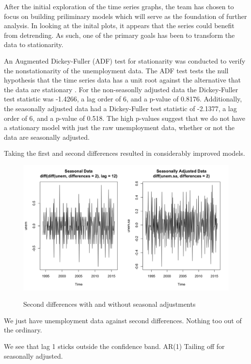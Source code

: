 {			After the initial exploration of the time series graphs, the team has chosen to focus on building priliminary models which will serve as the foundation of further analysis. In looking at the inital plots, it appears that the series could benefit from detrending. As such, one of the primary goals has been to transform the data to stationarity. \newline
			
			An Augmented Dickey-Fuller (ADF) test for stationarity was conducted to verify the nonstationarity of the unemployment data.  The ADF test tests the null hypothesis that the time series data has a unit root against the alternative that the data are stationary \citep{shumway2010time}. For the non-seasonlly adjusted data the Dickey-Fuller test statistic was -1.4266, a lag order of 6, and a p-value of 0.8176. Additionally, the seasonally adjusted data had a Dickey-Fuller test statistic of -2.1377, a lag order of 6, and a p-value of 0.518. The high p-values suggest that we do not have a stationary model with just the raw unemployment data, whether or not the data are seasonally adjusted.\newline
			
			Taking the first and second differences resulted in considerably improved models.

		
 \begin{figure}[H]
      	\centering
      	\caption{Second differences with and without seasonal adjustments}
      	\includegraphics[width=.7\linewidth]{images/stationarity}
      	\label{fig:secdiff}
      \end{figure}
		
		
		
		
		We just have unemployment data against second differences.
		Nothing too out of the ordinary.
		
		We see that lag 1 sticks outside the confidence band.  AR(1)
		Tailing off for seasonally adjusted.
		
}

